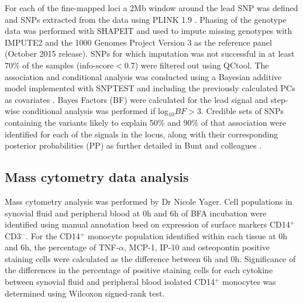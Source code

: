 
For each of the fine-mapped loci a 2Mb window around the lead SNP was defined and SNPs extracted from the data using PLINK 1.9 \parencite{Chang2015}. Phasing of the genotype data was performed with SHAPEIT \parencite{Delaneau2012} and used to impute missing genotypes with IMPUTE2 \parencite{Howie2009} and the 1000 Genomes Project Version 3 as the reference panel (October 2015 release). SNPs for which imputation was not successful in at least 70\% of the samples (info-score$<$0.7) were filtered out using QCtool. The association and conditional analysis was conducted using a Bayesian additive model implemented with SNPTEST and including the previously calculated PCs as covariates \parencite{Burton2007}. Bayes Factors (BF) were calculated for the lead signal and step-wise conditional analysis was performed if log$_{10}BF>$3. Credible sets of SNPs containing the variants likely to explain 50\% and 90\% of that association were identified for each of the signals in the locus, along with their corresponding posterior probabilities (PP) as further detailed in Bunt and colleagues \parencite{Bunt2015}.



\subsection{Mass cytometry data analysis}
Mass cytometry analysis was performed by Dr Nicole Yager. Cell populations in synovial fluid and peripheral blood at 0h and 6h of BFA incubation were identified using manual annotation bsed on expression of surface markers CD14$^+$ CD3$^-$. For the CD14$^+$ monocyte population identified within each tissue at 0h and 6h, the percentage of TNF-$\alpha$, MCP-1, IP-10 and osteopontin positive staining cells were calculated as the difference between 6h and 0h. Significance of the differences in the percentage of positive staining cells for each cytokine between synovial fluid and peripheral blood isolated CD14$^+$ monocytes was determined using Wilcoxon signed-rank test.  


